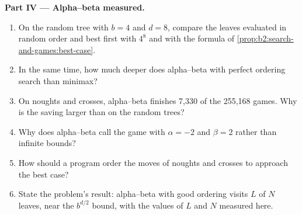 \begin{problem}
\medskip\noindent\textbf{Part IV --- Alpha--beta measured.}\par\nopagebreak
\begin{enumerate}[resume, beginpenalty=10000]
\item On the random tree with $b = 4$ and $d = 8$, compare the leaves evaluated in random order and best first with
$4^8$ and with the formula of \cref{prop:b2:search-and-games:best-case}.
\item In the same time, how much deeper does alpha--beta with perfect ordering search than minimax?
\item On noughts and crosses, alpha--beta finishes 7,330 of the 255,168 games. Why is the saving larger than on the random
trees?
\item Why does alpha--beta call the game with $\alpha = -2$ and $\beta = 2$ rather than infinite bounds?
\item How should a program order the moves of noughts and crosses to approach the best case?
\item State the problem's result: alpha--beta with good ordering visits $L$ of $N$ leaves, near the $b^{d/2}$ bound, with
the values of $L$ and $N$ measured here.
\end{enumerate}
\end{problem}
